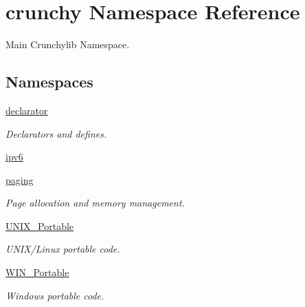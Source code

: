 \hypertarget{namespacecrunchy}{}\section{crunchy Namespace Reference}
\label{namespacecrunchy}


Main Crunchylib Namespace.  


\subsection*{Namespaces}
\begin{DoxyCompactItemize}
\item 
 \hyperlink{namespacecrunchy_1_1declarator}{declarator}
\begin{DoxyCompactList}\small\item\em Declarators and defines. \end{DoxyCompactList}\item 
 \hyperlink{namespacecrunchy_1_1ipv6}{ipv6}
\item 
 \hyperlink{namespacecrunchy_1_1paging}{paging}
\begin{DoxyCompactList}\small\item\em Page allocation and memory management. \end{DoxyCompactList}\item 
 \hyperlink{namespacecrunchy_1_1_u_n_i_x___portable}{U\+N\+I\+X\+\_\+\+Portable}
\begin{DoxyCompactList}\small\item\em U\+N\+I\+X/\+Linux portable code. \end{DoxyCompactList}\item 
 \hyperlink{namespacecrunchy_1_1_w_i_n___portable}{W\+I\+N\+\_\+\+Portable}
\begin{DoxyCompactList}\small\item\em Windows portable code. \end{DoxyCompactList}\end{DoxyCompactItemize}

